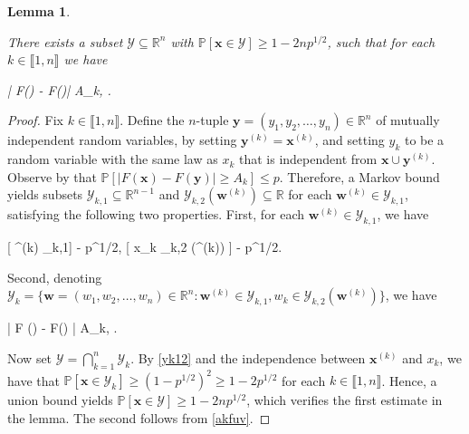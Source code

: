 \documentclass{amsart}
\numberwithin{equation}{section}
\newtheorem{lem}[thm]{Lemma}
\theoremstyle{remark}
\theoremstyle{definition}
\begin{document}
	\begin{lem} 
		
		\label{yprobability}
		
		There exists a subset $\mathcal{Y} \subseteq \mathbb{R}^n$ with $\mathbb{P}[\bm{x} \in \mathcal{Y}] \ge 1 - 2np^{1/2}$, such that for each $k \in \llbracket 1, n \rrbracket$ we have
		\begin{flalign*}
			| F() - F()| \le A_k, \qquad {}.
		\end{flalign*}
		
		
	\end{lem} 
	
	\begin{proof} 
		
		Fix $k \in \llbracket 1, n \rrbracket$. Define the $n$-tuple $\bm{y} = (y_1, y_2, \ldots , y_n) \in \mathbb{R}^n$ of mutually independent random variables, by setting $\bm{y}^{(k)} = \bm{x}^{(k)}$, and setting $y_k$ to be a random variable with the same law as $x_k$ that is independent from $\bm{x} \cup \bm{y}^{(k)}$. Observe by  that $\mathbb{P} [ |F(\bm{x}) - F(\bm{y})| \ge A_k ] \le p$. Therefore, a Markov bound yields subsets $\mathcal{Y}_{k,1} \subseteq \mathbb{R}^{n-1}$ and $\mathcal{Y}_{k,2} (\bm{w}^{(k)}) \subseteq \mathbb{R}$ for each $\bm{w}^{(k)} \in \mathcal{Y}_{k,1}$, satisfying the following two properties. First, for each $\bm{w}^{(k)} \in \mathcal{Y}_{k,1}$, we have  
		\begin{flalign}
			\label{yk12} 
			[ ^{(k)} \subseteq {}_{k,1}]  - p^{1/2}, \qquad {} \qquad {} [ x_k \subseteq {}_{k,2} (^{(k)}) ]  - p^{1/2}.
		\end{flalign}
		
		\noindent Second, denoting $\mathcal{Y}_k = \{ \bm{w} = (w_1, w_2, \ldots , w_n) \in \mathbb{R}^n : \bm{w}^{(k)} \in \mathcal{Y}_{k,1}, w_k \in \mathcal{Y}_{k,2} (\bm{w}^{(k)}) \}$, we have 
		\begin{flalign}
			\label{akfuv} 
			| F () - F() | \le A_k, \qquad \text{for any $\bm{u}, \bm{v} \in \mathcal{Y}_k$ such that $\bm{u}^{(k)} = \bm{v}^{(k)}$}.
		\end{flalign} 
		
		Now set $\mathcal{Y} = \bigcap_{k=1}^n \mathcal{Y}_k$. By \eqref{yk12} and the independence between $\bm{x}^{(k)}$ and $x_k$, we have that $\mathbb{P}[ \bm{x} \in \mathcal{Y}_k] \ge (1 - p^{1/2})^2 \ge 1 - 2p^{1/2}$ for each $k \in \llbracket 1, n \rrbracket$. Hence, a union bound yields $\mathbb{P}[\bm{x} \in \mathcal{Y}] \ge 1 - 2n p^{1/2}$, which verifies the first estimate in the lemma. The second follows from \eqref{akfuv}.
	\end{proof} 
	
\end{document}
